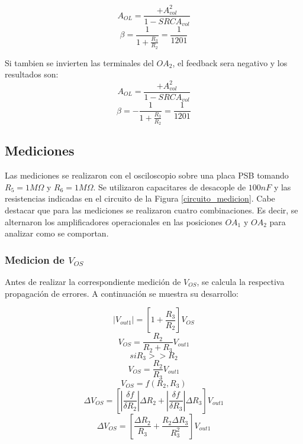 \documentclass[12pt,a4paper]{article}
\begin{document}
\begin{displaymath}  A_{OL}= \frac{+A_{vol}^2}{1-SRC A_{vol}}  \end{displaymath}
\begin{displaymath}  \beta =  \frac{1}{1+ \frac{R_3}{R_2}} = \frac{1}{1201}  \end{displaymath}

Si tambien se invierten las terminales del $OA_2$, el feedback sera negativo y los resultados son:
\begin{displaymath}  A_{OL}= \frac{+A_{vol}^2}{1-SRC A_{vol}}  \end{displaymath}
\begin{displaymath}  \beta =  -\frac{1}{1+ \frac{R_3}{R_2}} = \frac{1}{1201}  \end{displaymath}

\subsection{Mediciones}
Las mediciones se realizaron con el osciloscopio sobre una placa PSB tomando $R_5 = 1M\Omega$ y $R_6 = 1M\Omega$. Se utilizaron capacitares de desacople de $100nF$ y las resistencias indicadas en el circuito de la Figura \ref{circuito_medicion}.
Cabe destacar que para las mediciones se realizaron cuatro combinaciones. Es decir, se alternaron los amplificadores operacionales en las posiciones $OA_1$ y $OA_2$ para analizar como se comportan. 


\subsubsection{Medicion de $V_{OS}$}

Antes de realizar la correspondiente medición de $V_{OS}$, se calcula la respectiva propagación de errores.  A continuación se muestra su desarrollo:

\begin{displaymath} |V_{out1}| = [1 + \frac{R_3}{R_2}]V_{OS} \end{displaymath}
\begin{displaymath} V_{OS} = \frac{R_2}{R_2 + R_3} V_{out1} \end{displaymath}
\begin{displaymath} si R_3 >> R_2 \end{displaymath}  
\begin{displaymath} V_{OS} = \frac{R_2}{R_3} V_{out1} \end{displaymath} 
\begin{displaymath} V_{OS} = f(R_2,R_3) \end{displaymath} 
\begin{displaymath} \Delta V_{OS} = [|\frac{\delta f}{\delta R_2}| \Delta R_2 + |\frac{\delta f}{\delta R_3}| \Delta R_3 ] V_{out1} \end{displaymath} 
\begin{displaymath} \Delta V_{OS} = [\frac {\Delta R_2} { R_3} + \frac{R_2 \Delta R_3 }{R_3^2}] V_{out1} \end{displaymath} 
\end{document}
